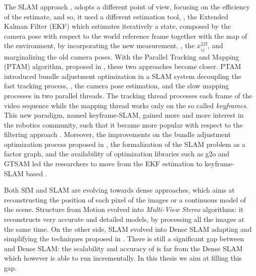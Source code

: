 The SLAM approach \cite{davison2007monoslam,ceriani2014single,grasa2011ekf},  adopts a different point of view, focusing on the efficiency of the estimate, and so, it used a different estimation tool, \ie, the Extended Kalman Filter (EKF) which estimates iteratively a state, composed by the camera pose with respect to the world reference frame together with the map of the environment, by incorporating the new measurement, \ie, the $x_{ij}^{2D}$, and marginalizing the old camera poses.  
With the Parallel Tracking and Mapping (PTAM) algorithm, proposed in \cite{klein_murray07}, these two approaches become closer. 
PTAM introduced bundle adjustment optimization in a SLAM system decoupling the fast tracking process, \ie, the camera pose estimation, and the slow mapping processes in two parallel threads.  
The tracking thread processes each frame of the video sequence while the mapping thread works only on the so called \emph{keyframes}. 
This new paradigm, named keyframe-SLAM, gained more and more interest in the robotics community, such that it became more popular with respect to the filtering approach \cite{strasdat2010real}.
Moreover, the improvements on the bundle adjustment optimization process proposed in \cite{kaess2008isam},  the formalization of the SLAM problem as a factor graph\cite{thrun2006graph}, and the availability of optimization libraries such as g2o \cite{kummerle2011g} and GTSAM \cite{dellaert2012factor} led the researchers to move from the EKF estimation to keyframe-SLAM based  \cite{strasdat11,sunderhauf2012towards,johannsson2013temporally}. 



Both SfM and SLAM are evolving towards dense approaches, which aims at reconstructing the position of each pixel of the images or a continuous model of the scene. 
Structure from Motion evolved into \emph{Multi-View Stereo} algorithms: it reconstructs very accurate and detailed models, by processing all the images at the same time.
On the other side, SLAM evolved into Dense SLAM adapting and simplifying the techniques proposed  in \mvs.
There is still a significant gap between \mvs and Dense SLAM: the scalability and accuracy of \mvs is far from the Dense SLAM which however is able to run incrementally. 
In this thesis we aim at filling this gap.


